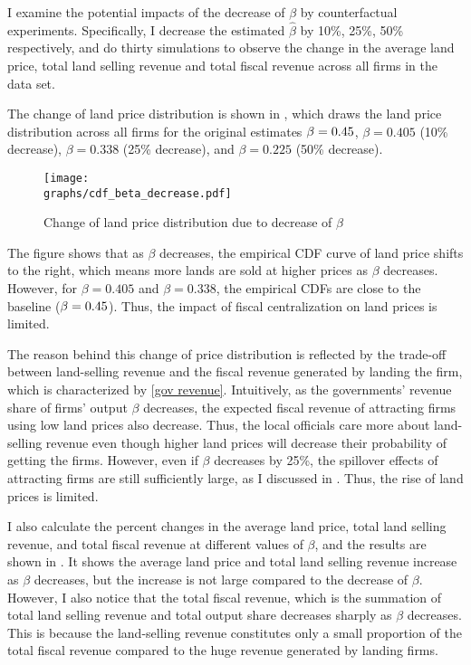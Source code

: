 I examine the potential impacts of the decrease of $\beta$ by counterfactual experiments. Specifically,
I decrease the estimated $\hat{\beta}$ by 10\%, 25\%, 50\% respectively, and do thirty simulations to
observe the change in the average land price, total land selling revenue
and total fiscal revenue across all firms in the data set.

The change of land price distribution is shown in ,
which draws the land price distribution across all firms for the original estimates $\beta = 0.45$,
$\beta = 0.405$ (10\% decrease), $\beta = 0.338$ (25\% decrease), and $\beta=0.225$ (50\% decrease).

\begin{figure}[H]
    \centering
    \caption{Change of land price distribution due to decrease of $\beta$}
    \texttt{[image: \\graphs/cdf\_beta\_decrease.pdf]}
    \label{fig: decrease of beta}
\end{figure}

The figure shows that as $\beta$ decreases, the empirical CDF curve of land price shifts to the right,
which means more lands are sold at higher prices as $\beta$ decreases. However,
for $\beta = 0.405$ and $\beta = 0.338$, the empirical CDFs are close to the baseline
($\beta = 0.45$). Thus, the impact of fiscal centralization on land prices is limited.


The reason behind this change of price distribution is reflected by the trade-off between
land-selling revenue and the fiscal revenue generated by landing the firm, which is characterized
by \eqref{gov revenue}. Intuitively, as the governments' revenue share of firms'
output $\beta$ decreases, the expected fiscal revenue of attracting firms using low land prices
also decrease. Thus, the local officials care more about
land-selling revenue even though higher land prices will decrease their probability of
getting the firms. However, even if $\beta$ decreases by 25\%, the spillover effects of
attracting firms are still sufficiently large, as I discussed in
.
Thus, the rise of land prices is limited.

I also calculate the percent changes in the average land price, total land selling revenue, and
total fiscal revenue at different values of $\beta$, and the results are shown in
. It shows
the average land price and total land selling revenue increase as $\beta$ decreases, but
the increase is not large compared to the decrease of $\beta$.
However, I also notice that the total fiscal revenue, which is the summation of
total land selling revenue and total output share decreases sharply as $\beta$ decreases.
This is because the land-selling revenue constitutes only a small proportion of
the total fiscal revenue compared to the huge revenue generated by landing firms.


